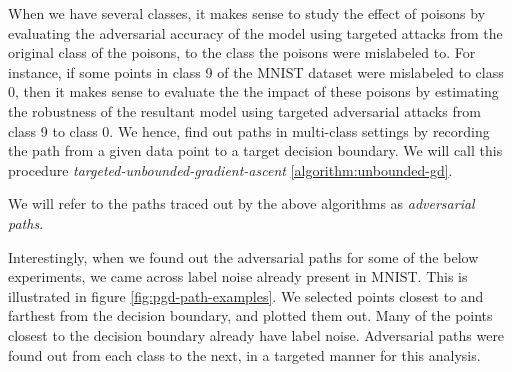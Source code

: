 \documentclass{ociamthesis}
\begin{document}
When we have several classes, it makes sense to study the effect of poisons by
evaluating the adversarial accuracy of the model using targeted attacks from the
original class of the poisons, to the class the poisons were mislabeled to. For
instance, if some points in class 9 of the MNIST dataset were mislabeled to
class 0, then it makes sense to evaluate the the impact of these poisons by
estimating the robustness of the resultant model using targeted adversarial
attacks from class 9 to class 0. We hence, find out paths in multi-class
settings by recording the path from a given data point to a target decision
boundary. We will call this procedure \emph{targeted-unbounded-gradient-ascent}
\ref{algorithm:unbounded-gd}.

We will refer to the paths traced out by the above algorithms as
\emph{adversarial paths}.

Interestingly, when we found out the adversarial paths for some of the below
experiments, we came across label noise already present in MNIST. This is
illustrated in figure \ref{fig:pgd-path-examples}. We selected points closest to
and farthest from the decision boundary, and plotted them out. Many of the
points closest to the decision boundary already have label noise. Adversarial
paths were found out from each class to the next, in a targeted manner for this
analysis.
\end{document}
